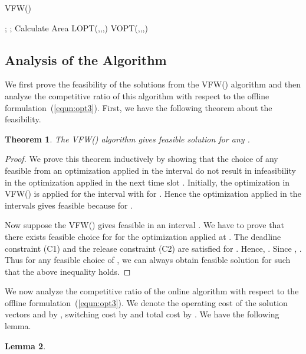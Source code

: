 \documentclass[10pt,conference,compsocconf,letterpaper]{IEEEtran}
\newtheorem{lemma}{\bf Lemma}
\newtheorem{theorem}[lemma]{\bf Theorem}
\begin{document}
\begin{algorithm}
\caption{VFW()}
\label{VFW}
{\small{
\begin{algorithmic}[1]
\STATE ; 
\STATE ; 
\STATE 
\STATE 
{}
\STATE Calculate Area 
\IF {}
\STATE 
\ENDIF
{}
\STATE 
\ELSE
\STATE 
\ENDIF
\IF{}
\STATE   LOPT(,,,)
\ELSE
\STATE   VOPT(,,,)
\ENDIF
\STATE 
\ENDFOR
\end{algorithmic}
}}
\end{algorithm}




\subsection{Analysis of the Algorithm}
We first prove the feasibility of the solutions from the VFW() algorithm and then analyze the competitive ratio of this algorithm with respect to the offline formulation~(\ref{equn:opt3}). First, we have the following theorem about the feasibility.


\begin{theorem}
\label{theorem:online3}
The VFW() algorithm gives feasible solution for any .
\end{theorem}

\begin{proof}
We prove this theorem inductively by showing that the choice of any feasible  from an optimization applied in the interval  do not result in infeasibility in the optimization applied in the next time slot . Initially, the optimization in VFW() is applied for the interval  with  for . Hence the optimization applied in the intervals  gives feasible   because  for .

Now suppose the VFW() gives feasible  in an interval . We have to prove that there exists feasible choice for  for the optimization applied at . The deadline constraint (C1) and the release constraint (C2) are satisfied for . Hence, . Since , . Thus for any feasible choice of , we can always obtain feasible solution for  such that the above inequality holds.
\end{proof}


We now analyze the competitive ratio of the online algorithm with respect to the offline formulation~(\ref{equn:opt3}). We denote the operating cost of the solution vectors  and  by  , switching cost by  and total cost by   . We have the following lemma.


\begin{lemma}
\label{lemma:online24}

\end{lemma}
\end{document}
